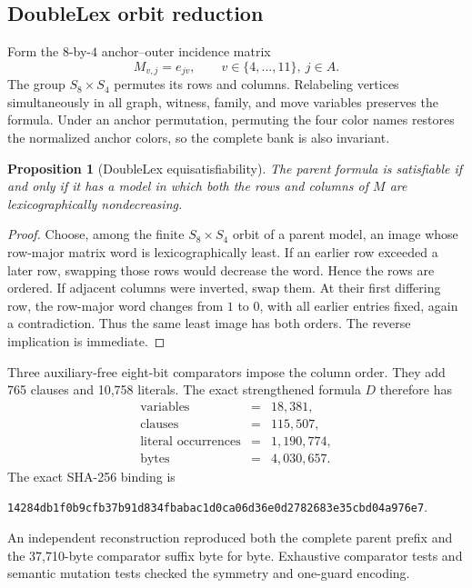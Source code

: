 \documentclass[11pt]{article}
\newtheorem{proposition}[theorem]{Proposition}
\theoremstyle{definition}
\theoremstyle{remark}
\newcommand{\filehash}[1]{\nolinkurl{#1}}
\begin{document}
\subsection{DoubleLex orbit reduction}

Form the \(8\)-by-\(4\) anchor--outer incidence matrix
\[
  M_{v,j}=e_{jv},\qquad v\in\{4,\ldots,11\},\ j\in A.
\tag{5.10}
\]
The group \(S_8\times S_4\) permutes its rows and columns.  Relabeling
vertices simultaneously in all graph, witness, family, and move variables
preserves the formula.  Under an anchor permutation, permuting the four
color names restores the normalized anchor colors, so the complete bank is
also invariant.

\begin{proposition}[DoubleLex equisatisfiability]
\label{prop:doublelex}
The parent formula is satisfiable if and only if it has a model in which
both the rows and columns of \(M\) are lexicographically nondecreasing.
\end{proposition}

\begin{proof}
Choose, among the finite \(S_8\times S_4\) orbit of a parent model, an
image whose row-major matrix word is lexicographically least.  If an
earlier row exceeded a later row, swapping those rows would decrease the
word.  Hence the rows are ordered.  If adjacent columns were inverted,
swap them.  At their first differing row, the row-major word changes from
\(1\) to \(0\), with all earlier entries fixed, again a contradiction.
Thus the same least image has both orders.  The reverse implication is
immediate.
\end{proof}

Three auxiliary-free eight-bit comparators impose the column order.  They
add 765 clauses and 10,758 literals.  The exact strengthened formula \(D\)
therefore has
\[
\begin{array}{rcl}
\text{variables}&=&18,381,\\
\text{clauses}&=&115,507,\\
\text{literal occurrences}&=&1,190,774,\\
\text{bytes}&=&4,030,657.
\end{array}
\tag{5.11}
\]
The exact SHA-256 binding is
\begin{center}
\filehash{14284db1f0b9cfb37b91d834fbabac1d0ca06d36e0d2782683e35cbd04a976e7}.
\end{center}
An independent reconstruction reproduced both the complete parent prefix
and the 37,710-byte comparator suffix byte for byte.  Exhaustive comparator
tests and semantic mutation tests checked the symmetry and one-guard
encoding.
\end{document}
